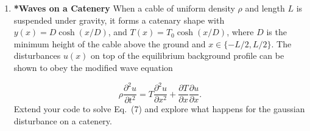 \documentclass[11pt]{article}
\begin{document}
\begin{enumerate}
\item \textbf{*Waves on a Catenery} When a cable of uniform density $\rho$ and length $L$ is suspended under gravity, it forms a catenary shape with $y(x) = D \cosh{(x/D)}$, and $T(x) = T_0 \cosh{(x/D)}$, where $D$ is the minimum height of the cable above the ground and $x\in \{-L/2,L/2\}$. The disturbances $u(x)$ on top of the equilibrium background profile can be shown to obey the modified wave equation
 
\begin{equation}
\rho \frac{\partial^2 u}{\partial t^2} = T\frac{\partial^2 u}{\partial x^2} + \frac{\partial T}{\partial x} \frac{\partial u}{\partial x}.
\end{equation}
Extend your code to solve Eq.~(7) and explore what happens for the gaussian disturbance on a catenery.




\end{enumerate}
\end{document}
